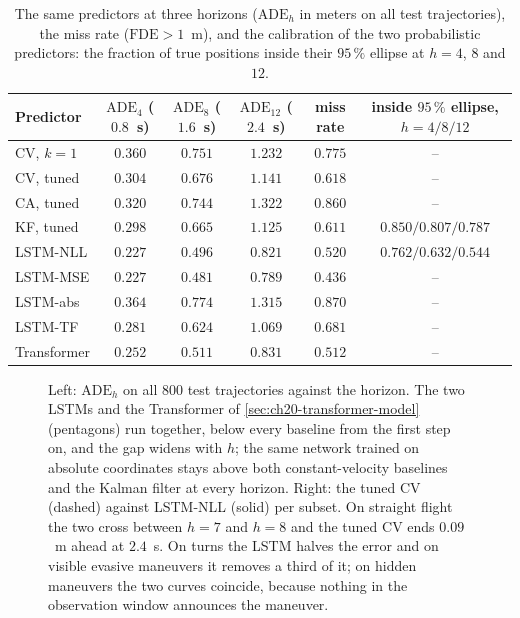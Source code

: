 \begin{table}[tb]
  \centering\small
  \caption{The same predictors at three horizons ($\mathrm{ADE}_h$ in meters on
  all test trajectories), the miss rate ($\mathrm{FDE} > 1$~m), and the
  calibration of the two probabilistic predictors: the fraction of true
  positions inside their $95\,\%$ ellipse at $h = 4$, $8$ and $12$.}
  \label{tab:ch20-horizon}
  \setlength{\tabcolsep}{5pt}\footnotesize
  \begin{tabular}{@{}lccccc@{}}
  \toprule
  Predictor & $\mathrm{ADE}_4$ ($0.8$~s) & $\mathrm{ADE}_8$ ($1.6$~s) & $\mathrm{ADE}_{12}$ ($2.4$~s) & miss rate & inside $95\,\%$ ellipse, $h = 4/8/12$\\
  \midrule
  CV, $k = 1$ & $0.360$ & $0.751$ & $1.232$ & $0.775$ & --\\
  CV, tuned & $0.304$ & $0.676$ & $1.141$ & $0.618$ & --\\
  CA, tuned & $0.320$ & $0.744$ & $1.322$ & $0.860$ & --\\
  KF, tuned & $0.298$ & $0.665$ & $1.125$ & $0.611$ & $0.850 / 0.807 / 0.787$\\
  LSTM-NLL & $0.227$ & $0.496$ & $0.821$ & $0.520$ & $0.762 / 0.632 / 0.544$\\
  LSTM-MSE & $0.227$ & $0.481$ & $0.789$ & $0.436$ & --\\
  LSTM-abs & $0.364$ & $0.774$ & $1.315$ & $0.870$ & --\\
  LSTM-TF & $0.281$ & $0.624$ & $1.069$ & $0.681$ & --\\
  \midrule
  Transformer & $0.252$ & $0.511$ & $0.831$ & $0.512$ & --\\
  \bottomrule
  \end{tabular}
\end{table}

\begin{figure}[tb]
  \centering
  \caption{Left: $\mathrm{ADE}_h$ on all $800$ test trajectories against the
  horizon. The two LSTMs and the Transformer of
  \cref{sec:ch20-transformer-model} (pentagons) run together, below every
  baseline from the first step on, and the gap widens with $h$; the same
  network trained on absolute coordinates stays above both constant-velocity
  baselines and the Kalman filter at every horizon. Right: the tuned CV
  (dashed) against LSTM-NLL (solid) per subset. On straight flight the two
  cross between $h = 7$ and $h = 8$ and the tuned CV ends $0.09$~m ahead at
  $2.4$~s. On turns the LSTM halves the error and on visible evasive
  maneuvers it removes a third of it; on hidden maneuvers the two curves
  coincide, because nothing in the observation window announces the
  maneuver.}
  \label{fig:ch20-results}
\end{figure}

